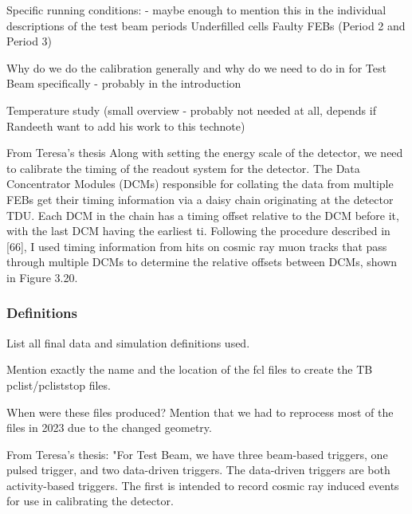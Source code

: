 \documentclass[12pt,a4paper]{article}
\begin{document}
Specific running conditions: - maybe enough to mention this in the individual descriptions of the test beam periods
Underfilled cells
Faulty FEBs (Period 2 and Period 3)

Why do we do the calibration generally and why do we need to do in for Test Beam specifically - probably in the introduction

Temperature study (small overview - probably not needed at all, depends if Randeeth want to add his work to this technote)

From Teresa's thesis
Along with setting the energy scale of the detector, we need to calibrate the timing of the readout system for the detector. The Data Concentrator Modules (DCMs) responsible for collating the data from multiple FEBs get their timing information via a daisy chain originating at the detector TDU. Each DCM in the chain has a timing offset relative to the DCM before it, with the last DCM having the earliest ti. Following the procedure described in [66], I used timing information from hits on cosmic ray muon tracks that pass through multiple DCMs to determine the relative offsets between DCMs, shown in Figure 3.20.

\subsubsection{Definitions}
List all final data and simulation definitions used.

Mention exactly the name and the location of the fcl files to create the TB pclist/pcliststop files.

When were these files produced? Mention that we had to reprocess most of the files in 2023 due to the changed geometry.

From Teresa's thesis:
"For Test Beam, we have three beam-based triggers, one pulsed trigger, and two data-driven triggers. The data-driven triggers are both activity-based triggers. The first is intended to record cosmic ray induced events for use in calibrating the detector.
\end{document}

